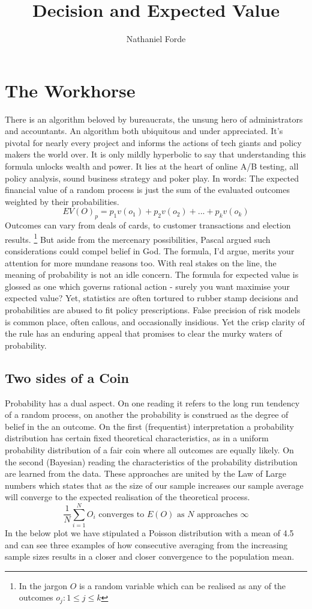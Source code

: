 \documentclass[10pt,a4paper,notitlepage, twocolumn]{article}
\author{Nathaniel Forde}
\title{Decision and Expected Value}
\begin{document}
\section*{The Workhorse}
There is an algorithm beloved by bureaucrats, the unsung hero of administrators and accountants. An algorithm  both ubiquitous and under appreciated. It's pivotal for nearly every project and informs the actions of tech giants and policy makers the world over. It is only mildly hyperbolic to say that understanding this formula unlocks wealth and power. It lies at the heart of online A/B testing, all policy analysis, sound business strategy and poker play. In words: The expected financial value of a random process is just the sum of the evaluated outcomes weighted by their probabilities. 
$$ EV(O)_{p} = p_{1}v(o_{1}) + p_{2}v(o_{2}) + ... + p_{k}v(o_{k}) $$
Outcomes can vary from deals of cards, to customer transactions and election results. \footnote{In the jargon $O$ is a random variable which can be realised as any of the outcomes  $ o_{j} :  1 \leq j \leq k$} But aside from the mercenary possibilities, Pascal argued such considerations could compel belief in God. The formula, I'd argue, merits your attention for more mundane reasons too. With real stakes on the line, the meaning of probability is not an idle concern. The formula for expected value is glossed as one which governs rational action - surely you want maximise your expected value? Yet, statistics are often tortured to rubber stamp decisions and probabilities are abused to fit policy prescriptions. False precision of risk models is common place, often callous, and occasionally insidious. Yet the crisp clarity of the rule has an enduring appeal that promises to clear the murky waters of probability.

\subsection*{Two sides of a Coin}
Probability has a dual aspect. On one reading it refers to the long run tendency of a random process, on another the probability is construed as the degree of belief in the an outcome. On the first (frequentist) interpretation a probability distribution has certain fixed theoretical characteristics, as in a uniform probability distribution of a fair coin where all outcomes are equally likely. On the second (Bayesian) reading the characteristics of the probability distribution are learned from the data. These approaches are united by the Law of Large numbers which states that as the size of our sample increases our sample average will converge to the expected realisation of the theoretical process.
$$  \frac{1}{N} \sum_{i = 1}^{N} O_{i} \text{ converges to }  E(O) \text{ as } N \text{ approaches } \infty $$ 
In the below plot we have stipulated a Poisson distribution with a mean of 4.5 and can see three examples of how consecutive averaging from the increasing sample sizes results in a closer and closer convergence to the population mean.
\end{document}
